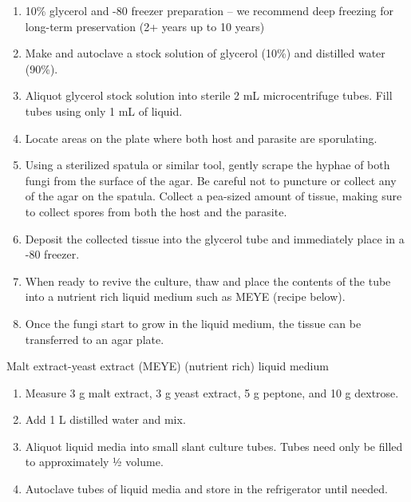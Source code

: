 \documentclass[]{book}
\providecommand{\tightlist}{%
  \setlength{\itemsep}{0pt}\setlength{\parskip}{0pt}}
\begin{document}
\begin{enumerate}
\item
  {10\% glycerol and -80 freezer preparation -- we recommend deep
  freezing for long-term preservation (2+ years up to 10 years)}
\item
  Make and autoclave a stock solution of glycerol (10\%) and distilled
  water (90\%).
\item
  Aliquot glycerol stock solution into sterile 2 mL microcentrifuge
  tubes. Fill tubes using only 1 mL of liquid.
\item
  Locate areas on the plate where both host and parasite are
  sporulating.
\item
  Using a sterilized spatula or similar tool, gently scrape the hyphae
  of both fungi from the surface of the agar. Be careful not to puncture
  or collect any of the agar on the spatula. Collect a pea-sized amount
  of tissue, making sure to collect spores from both the host and the
  parasite.
\item
  Deposit the collected tissue into the glycerol tube and immediately
  place in a -80 freezer.
\item
  When ready to revive the culture, thaw and place the contents of the
  tube into a nutrient rich liquid medium such as MEYE (recipe below).
\item
  Once the fungi start to grow in the liquid medium, the tissue can be
  transferred to an agar plate.
\end{enumerate}

{Malt extract-yeast extract (MEYE) (nutrient rich) liquid medium}

\begin{enumerate}
\def\labelenumi{\arabic{enumi}.}
\tightlist
\item
  Measure 3 g malt extract, 3 g yeast extract, 5 g peptone, and 10 g
  dextrose.
\item
  Add 1 L distilled water and mix.
\item
  Aliquot liquid media into small slant culture tubes. Tubes need only
  be filled to approximately ½ volume.
\item
  Autoclave tubes of liquid media and store in the refrigerator until
  needed.
\end{enumerate}
\end{document}
